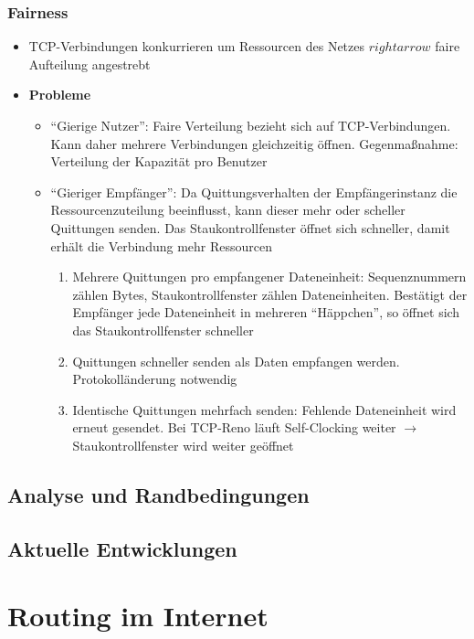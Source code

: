 \subsubsection{Fairness}
\begin{itemize}
	\item TCP-Verbindungen konkurrieren um Ressourcen des Netzes \(rightarrow\) faire Aufteilung angestrebt
	\item \textbf{Probleme}
	\begin{itemize}
		\item "`Gierige Nutzer"': Faire Verteilung bezieht sich auf TCP-Verbindungen. Kann daher mehrere Verbindungen gleichzeitig öffnen. Gegenmaßnahme: Verteilung der Kapazität pro Benutzer
		\item "`Gieriger Empfänger"': Da Quittungsverhalten der Empfängerinstanz die Ressourcenzuteilung beeinflusst, kann dieser mehr oder scheller Quittungen senden. Das Staukontrollfenster öffnet sich schneller, damit erhält die Verbindung mehr Ressourcen
		\begin{enumerate}
			\item Mehrere Quittungen pro empfangener Dateneinheit: Sequenznummern zählen Bytes, Staukontrollfenster zählen Dateneinheiten. Bestätigt der Empfänger jede Dateneinheit in mehreren "`Häppchen"', so öffnet sich das Staukontrollfenster schneller
			\item Quittungen schneller senden als Daten empfangen werden. Protokolländerung notwendig
			\item Identische Quittungen mehrfach senden: Fehlende Dateneinheit wird erneut gesendet. Bei TCP-Reno läuft Self-Clocking weiter \(\rightarrow\) Staukontrollfenster wird weiter geöffnet
		\end{enumerate}
	\end{itemize}
\end{itemize}

\subsection{Analyse und Randbedingungen}


\subsection{Aktuelle Entwicklungen}



\section{Routing im Internet}

